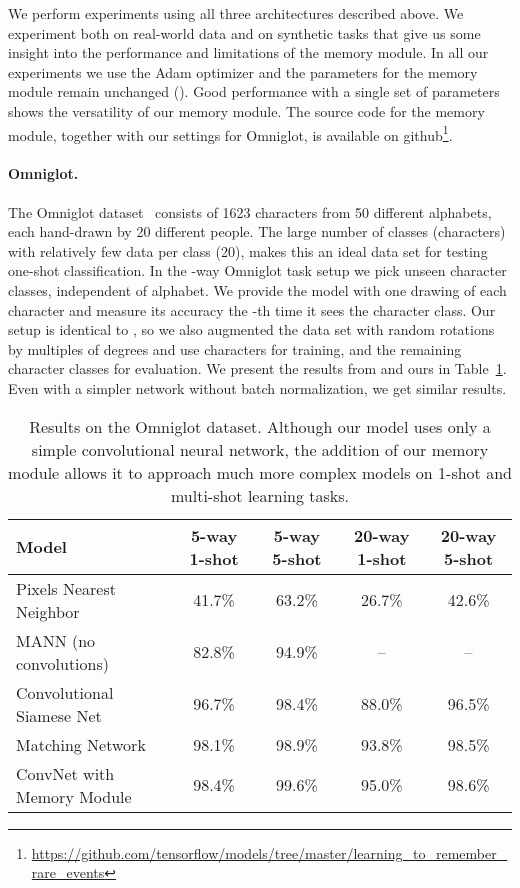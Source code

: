 \documentclass{article} \usepackage{iclr2017_conference,times}
\begin{document}
We perform experiments using all three architectures described above.
We experiment both on real-world data and on synthetic tasks that give
us some insight into the performance and limitations of the memory module.
In all our experiments we use the Adam optimizer \citep{adam} and the
parameters for the memory module remain unchanged ().
Good performance with a single set of parameters shows the versatility
of our memory module. The source code for the memory module, together
with our settings for Omniglot, is available on github\footnote{
\url{https://github.com/tensorflow/models/tree/master/learning_to_remember_rare_events}}.

\paragraph{Omniglot.}
The Omniglot dataset~\citep{oneshot} consists of 1623 characters from
50 different alphabets, each hand-drawn by 20 different people.
The large number of classes (characters) with relatively few data per class
(20), makes this an ideal data set for testing one-shot classification.
In the -way Omniglot task setup we pick  unseen character classes,
independent of alphabet. We provide the model with one drawing of each character
and measure its accuracy the -th time it sees the character class.
Our setup is identical to \cite{matching_nets}, so we also augmented
the data set with random rotations by multiples of  degrees and use 
characters for training, and the remaining character classes for evaluation.
We present the results from \cite{matching_nets} and ours in Table~\ref{tab:omniglot}.
Even with a simpler network without batch normalization, we get similar results.

\begin{table}\caption{Results on the Omniglot dataset.  Although our model uses only a simple
convolutional neural network, the addition of our memory module allows it to approach
much more complex models on 1-shot and multi-shot learning tasks.}
\begin{center}
\begin{tabular}{|l||c|c|c|c|}
\hline
{\bf Model}                 & 5-way 1-shot & 5-way 5-shot & 20-way 1-shot & 20-way 5-shot \\ \hline
Pixels Nearest Neighbor     &  41.7\%      & 63.2\%       & 26.7\%        & 42.6\% \\
MANN (no convolutions)      &  82.8\%      & 94.9\%       & --            & -- \\
Convolutional Siamese Net   &  96.7\%      & 98.4\%       & 88.0\%        & 96.5\% \\
Matching Network            &  98.1\%      & 98.9\%       & 93.8\%        & 98.5\% \\
\hline
ConvNet with Memory Module  &  98.4\%      & 99.6\%       & 95.0\%        & 98.6\% \\
\hline
\end{tabular}
\end{center}
\label{tab:omniglot}
\end{table}
\end{document}
